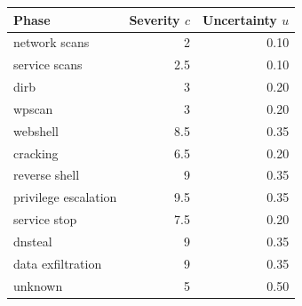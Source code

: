 \begin{tabular}{lrr}
\toprule
Phase & Severity $c$ & Uncertainty $u$ \\
\midrule
network scans & 2 & 0.10 \\
service scans & 2.5 & 0.10 \\
dirb & 3 & 0.20 \\
wpscan & 3 & 0.20 \\
webshell & 8.5 & 0.35 \\
cracking & 6.5 & 0.20 \\
reverse shell & 9 & 0.35 \\
privilege escalation & 9.5 & 0.35 \\
service stop & 7.5 & 0.20 \\
dnsteal & 9 & 0.35 \\
data exfiltration & 9 & 0.35 \\
unknown & 5 & 0.50 \\
\bottomrule
\end{tabular}
